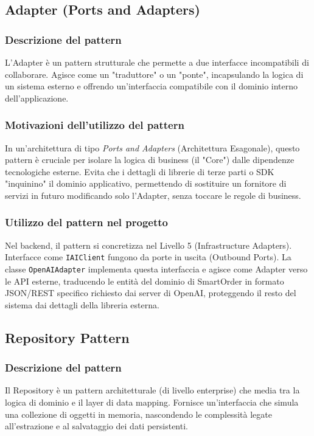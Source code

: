 \documentclass[a4paper, 11pt, oneside]{scrartcl}
\begin{document}
\subsection{Adapter (Ports and Adapters)}

\subsubsection{Descrizione del pattern}
L'Adapter è un pattern strutturale che permette a due interfacce incompatibili di collaborare. Agisce come un "traduttore" o un "ponte", incapsulando la logica di un sistema esterno e offrendo un'interfaccia compatibile con il dominio interno dell'applicazione.

\subsubsection{Motivazioni dell'utilizzo del pattern}
In un'architettura di tipo \textit{Ports and Adapters} (Architettura Esagonale), questo pattern è cruciale per isolare la logica di business (il "Core") dalle dipendenze tecnologiche esterne. Evita che i dettagli di librerie di terze parti o SDK "inquinino" il dominio applicativo, permettendo di sostituire un fornitore di servizi in futuro modificando solo l'Adapter, senza toccare le regole di business.

\subsubsection{Utilizzo del pattern nel progetto}
Nel backend, il pattern si concretizza nel Livello 5 (Infrastructure Adapters). Interfacce come \texttt{IAIClient} fungono da porte in uscita (Outbound Ports). La classe \texttt{OpenAIAdapter} implementa questa interfaccia e agisce come Adapter verso le API esterne, traducendo le entità del dominio di SmartOrder in formato JSON/REST specifico richiesto dai server di OpenAI, proteggendo il resto del sistema dai dettagli della libreria esterna.

\subsection{Repository Pattern}

\subsubsection{Descrizione del pattern}
Il Repository è un pattern architetturale (di livello enterprise) che media tra la logica di dominio e il layer di data mapping. Fornisce un'interfaccia che simula una collezione di oggetti in memoria, nascondendo le complessità legate all'estrazione e al salvataggio dei dati persistenti.
\end{document}
